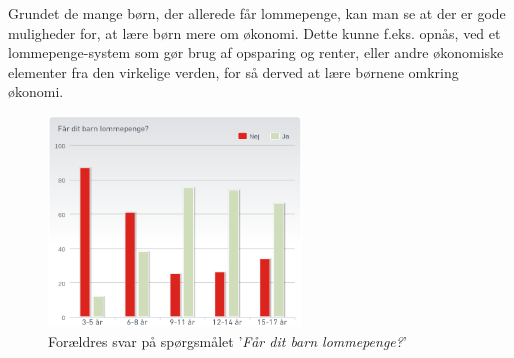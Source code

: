 Grundet de mange børn, der allerede får lommepenge, kan man se at der er gode muligheder for, at lære børn mere om økonomi. Dette kunne f.eks. opnås, ved et lommepenge-system som gør brug af opsparing og renter, eller andre økonomiske elementer fra den virkelige verden, for så derved at lære børnene omkring økonomi.
\begin{figure}[htb]
\centering
\includegraphics[width=0.6\textwidth]{Billeder/FaarBarnLommepenge.png}
\caption{Forældres svar på spørgsmålet '\textit{Får dit barn lommepenge?}'}
\label{FaarBarnLommepenge}
\end{figure}
